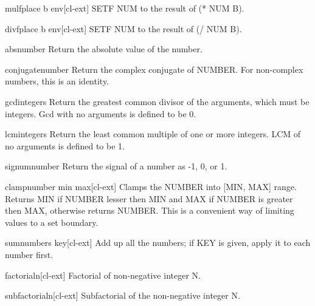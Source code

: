 \documentclass[10pt,english]{book}
\begin{document}
\begin{macro}{mulf}{place b \env env}[cl-ext]
  SETF NUM to the result of (* NUM B).
\end{macro}

\begin{macro}{divf}{place b \env env}[cl-ext]
  SETF NUM to the result of (/ NUM B).
\end{macro}

\begin{function}{abs}{number}
  Return the absolute value of the number.
\end{function}

\begin{function}{conjugate}{number}
  Return the complex conjugate of NUMBER. For non-complex numbers, this is
  an identity.
\end{function}

\begin{function}{gcd}{\rest integers}
  Return the greatest common divisor of the arguments, which must be
  integers. Gcd with no arguments is defined to be 0.
\end{function}

\begin{function}{lcm}{\rest integers}
  Return the least common multiple of one or more integers. LCM of no
  arguments is defined to be 1.
\end{function}

\begin{function}{signum}{number}
  Return the signal of a number as -1, 0, or 1.
\end{function}

\begin{function}{clamp}{number min max}[cl-ext]
  Clamps the NUMBER into [MIN, MAX] range. Returns MIN if NUMBER
  lesser then MIN and MAX if NUMBER is greater then MAX, otherwise
  returns NUMBER. This is a convenient way of limiting values to a set
  boundary.
\end{function}

\begin{function}{sum}{numbers \op key}[cl-ext]
  Add up all the numbers; if KEY is given, apply it to each number
  first.
\end{function}

\begin{function}{factorial}{n}[cl-ext]
  Factorial of non-negative integer N.
\end{function}

\begin{function}{subfactorial}{n}[cl-ext]
  Subfactorial of the non-negative integer N.
\end{function}
\end{document}
